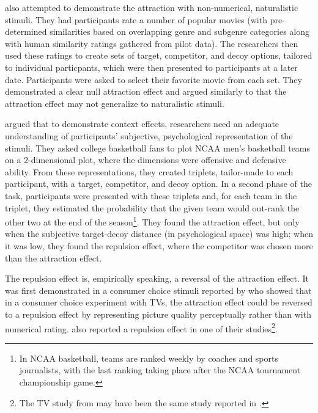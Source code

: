 \textcite{trendlZeroAttractionEffect2021} also attempted to demonstrate the attraction with non-numerical, naturalistic stimuli. They had participants rate a number of popular movies (with pre-determined similarities based on overlapping genre and subgenre categories along with human similarity ratings gathered from pilot data). The researchers then used these ratings to create sets of target, competitor, and decoy options, tailored to individual particpants, which were then presented to participants at a later date. Participants were asked to select their favorite movie from each set. They demonstrated a clear null attraction effect and argued similarly to \textcite{frederickLimitsAttraction2014b} that the attraction effect may not generalize to naturalistic stimuli.

\textcite{fang2024context} argued that to demonstrate context effects, researchers need an adequate understanding of participants' subjective, psychological representation of the stimuli. They asked college basketball fans to plot NCAA men's basketball teams on a 2-dimensional plot, where the dimensions were offensive and defensive ability. From these representations, they created triplets, tailor-made to each participant, with a target, competitor, and decoy option. In a second phase of the task, participants were presented with these triplets and, for each team in the triplet, they estimated the probability that the given team would out-rank the other two at the end of the season\footnote{In NCAA basketball, teams are ranked weekly by coaches and sports journalists, with the last ranking taking place after the NCAA tournament championship game.}. They found the attraction effect, but only when the subjective target-decoy distance (in psychological space) was high; when it was low, they found the repulsion effect, where the competitor was chosen more than the attraction effect.

The repulsion effect is, empirically speaking, a reversal of the attraction effect. It was first demonstrated in a consumer choice stimuli reported by \textcite{frederick2008attraction} who showed that in a consumer choice experiment with TVs, the attraction effect could be reversed to a repulsion effect by representing picture quality perceptually rather than with numerical rating. \textcite{frederickLimitsAttraction2014b} also reported a repulsion effect in one of their studies\footnote{The TV study from \textcite{frederick2008attraction} may have been the same study reported in \textcite{frederickLimitsAttraction2014b}.}. 

